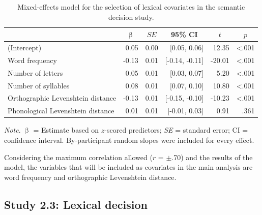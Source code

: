\documentclass[
  12pt,
  man,floatsintext]{apa7}
\begin{document}
\begin{table}[!h]

\caption{\label{tab:semanticdecision-lexical-covariates-selection}Mixed-effects model for the selection of lexical covariates in the semantic decision study.}
\centering
\begin{threeparttable}
\begin{tabular}[t]{lrrrrr}
\toprule
\multicolumn{1}{c}{ } & \multicolumn{1}{c}{$\upbeta$} & \multicolumn{1}{c}{$SE$} & \multicolumn{1}{c}{95\% CI} & \multicolumn{1}{c}{$t$} & \multicolumn{1}{c}{$p$}\\
\midrule
(Intercept) & 0.05 & 0.00 & {}[0.05, 0.06] & 12.35 & <.001\\
Word frequency & -0.13 & 0.01 & {}[-0.14, -0.11] & -20.01 & <.001\\
Number of letters & 0.05 & 0.01 & {}[0.03, 0.07] & 5.20 & <.001\\
Number of syllables & 0.08 & 0.01 & {}[0.07, 0.10] & 10.80 & <.001\\
Orthographic Levenshtein distance & -0.13 & 0.01 & {}[-0.15, -0.10] & -10.23 & <.001\\
Phonological Levenshtein distance & 0.01 & 0.01 & {}[-0.01, 0.03] & 0.91 & .361\\
\bottomrule
\end{tabular}
\begin{tablenotes}
\item \textit{\linebreak} 
\item \textit{Note}. $\upbeta$ = Estimate based on $z$-scored predictors; \textit{SE} = standard error; \linebreak \phantom{.}CI = confidence interval. By-participant random slopes were included for \linebreak \phantom{.}every effect.
\end{tablenotes}
\end{threeparttable}
\end{table}

Considering the maximum correlation allowed (\(r\) = \(\pm\).70) and the results of the model, the variables that will be included as covariates in the main analysis are word frequency and orthographic Levenshtein distance.

\hypertarget{study-2.3-lexical-decision}{%
\subsection{Study 2.3: Lexical decision}\label{study-2.3-lexical-decision}}
\end{document}
